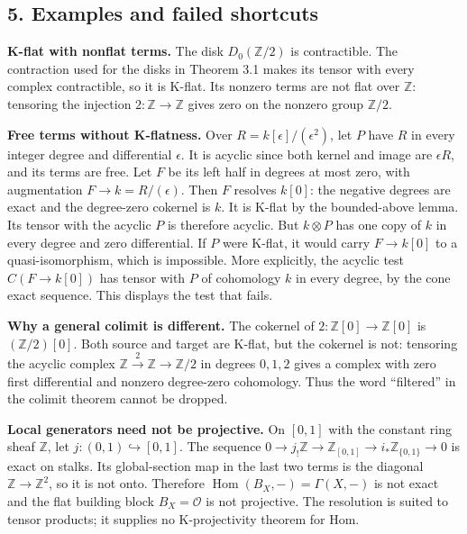 \documentclass[
  english,
  11pt,
  a4paper,
]{article}
\begin{document}
\subsection{5. Examples and failed
shortcuts}\label{flat-modules-and-k-flat-resolutions--5-examples-and-failed-shortcuts}

\textbf{K-flat with nonflat terms.} The disk \(D_0(\mathbb Z/2)\) is
contractible. The contraction used for the disks in Theorem 3.1 makes
its tensor with every complex contractible, so it is K-flat. Its nonzero
terms are not flat over \(\mathbb Z\): tensoring the injection
\(2:\mathbb Z\to\mathbb Z\) gives zero on the nonzero group
\(\mathbb Z/2\).

\textbf{Free terms without K-flatness.} Over
\(R=k[\epsilon]/(\epsilon^2)\), let \(P\) have \(R\) in every integer
degree and differential \(\epsilon\). It is acyclic since both kernel
and image are \(\epsilon R\), and its terms are free. Let \(F\) be its
left half in degrees at most zero, with augmentation
\(F\to k=R/(\epsilon)\). Then \(F\) resolves \(k[0]\): the negative
degrees are exact and the degree-zero cokernel is \(k\). It is K-flat by
the bounded-above lemma. Its tensor with the acyclic \(P\) is therefore
acyclic. But \(k\otimes P\) has one copy of \(k\) in every degree and
zero differential. If \(P\) were K-flat, it would carry \(F\to k[0]\) to
a quasi-isomorphism, which is impossible. More explicitly, the acyclic
test \(C(F\to k[0])\) has tensor with \(P\) of cohomology \(k\) in every
degree, by the cone exact sequence. This displays the test that fails.

\textbf{Why a general colimit is different.} The cokernel of
\(2:\mathbb Z[0]\to\mathbb Z[0]\) is \((\mathbb Z/2)[0]\). Both source
and target are K-flat, but the cokernel is not: tensoring the acyclic
complex \(\mathbb Z\xrightarrow{2}\mathbb Z\to\mathbb Z/2\) in degrees
\(0,1,2\) gives a complex with zero first differential and nonzero
degree-zero cohomology. Thus the word ``filtered'' in the colimit
theorem cannot be dropped.

\textbf{Local generators need not be projective.} On \([0,1]\) with the
constant ring sheaf \(\mathbb Z\), let \(j:(0,1)\hookrightarrow[0,1]\).
The sequence
\(0\to j_!\mathbb Z\to\mathbb Z_{[0,1]}\to i_*\mathbb Z_{\{0,1\}}\to0\)
is exact on stalks. Its global-section map in the last two terms is the
diagonal \(\mathbb Z\to\mathbb Z^2\), so it is not onto. Therefore
\(\operatorname{Hom}(B_X,-)=\Gamma(X,-)\) is not exact and the flat
building block \(B_X=\mathcal O\) is not projective. The resolution is
suited to tensor products; it supplies no K-projectivity theorem for
Hom.
\end{document}
